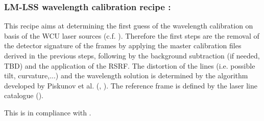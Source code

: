 \clearpage
\subsubsection{LM-LSS wavelength calibration recipe :}\label{rec:metis_lm_lss_wave}
This recipe aims at determining the first guess of the wavelength calibration on basis of the \ac{WCU} laser sources (c.f. \cite{METIS-calibration_plan}). Therefore the first steps are the removal of the detector signature of the  frames by applying the master calibration files derived in the previous steps, following by the background subtraction (if needed, TBD) and the application of the RSRF. The distortion of the lines (i.e. possible tilt, curvature,...) and the wavelength solution is determined by the algorithm developed by Piskunov et al. (\cite{pis02}, \cite{pis21}). The reference frame is defined by the laser line catalogue (\hyperref[dataitem:laser_tab]{}).

 This is in compliance with .

